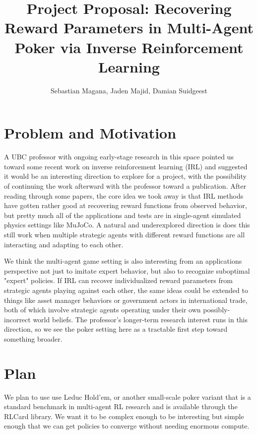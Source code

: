 \documentclass{article}
\title{\textbf{Project Proposal: Recovering Reward Parameters in Multi-Agent Poker via Inverse Reinforcement Learning}}
\author{Sebastian Magana, Jaden Majid, Damian Suidgeest}
\date{}
\begin{document}
\maketitle

\section*{Problem and Motivation}

A UBC professor with ongoing early-stage research in this space pointed us toward some recent work on inverse reinforcement learning (IRL) \cite{reddy2018, zeng2022, wei2024} and suggested
it would be an interesting direction to explore for a project, with the possibility of continuing the work
afterward with the professor toward a publication. After reading through some papers, the core idea we took away is that IRL
methods have gotten rather good at recovering reward functions from observed behavior, but pretty much all of the applications and tests are in single-agent simulated physics settings like MuJoCo. A natural and underexplored direction is does this still
work when multiple strategic agents with different reward functions are all interacting and
adapting to each other.



We think the multi-agent game setting is also interesting from an applications perspective not just to imitate expert behavior, but also to recognize suboptimal "expert" policies.
If IRL can recover individualized reward parameters from strategic agents playing against each other, the same
ideas could be extended to things like asset manager behaviors or
government actors in international trade, both of which involve strategic agents operating
under their own possibly-incorrect world beliefs. The professor's
longer-term research interest runs in this direction, so we see the poker setting here as a tractable
first step toward something broader.

\section*{Plan}

We plan to use use Leduc Hold'em, or another small-scale poker variant that is a standard
benchmark in multi-agent RL research and is available through the RLCard library. We want it to be complex enough to be interesting but simple enough that we can get policies to converge without needing enormous
compute.
\end{document}
